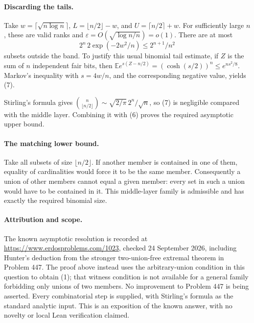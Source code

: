 \paragraph{Discarding the tails.}
Take \(w=\lceil\sqrt{n\log n}\rceil\),
\(L=\lfloor n/2\rfloor-w\), and \(U=\lceil n/2\rceil+w\).
For sufficiently large \(n\), these are valid ranks and
\(\varepsilon=O(\sqrt{\log n/n})=o(1)\).
There are at most
\[
 2^n\,2\exp(-2w^2/n)\leq 2^{n+1}/n^2 \tag{7}
\]
subsets outside the band. To justify this usual binomial tail estimate, if \(Z\) is the sum of \(n\) independent fair bits, then
\(\mathbb E e^{s(Z-n/2)}=(\cosh(s/2))^n\leq e^{ns^2/8}\).
Markov's inequality with \(s=4w/n\), and the corresponding negative value, yields (7).

Stirling's formula gives
\(\binom n{\lfloor n/2\rfloor}\sim\sqrt{2/\pi}\,2^n/\sqrt n\), so (7) is negligible compared with the middle layer. Combining it with (6) proves the required asymptotic upper bound.

\paragraph{The matching lower bound.}
Take all subsets of size \(\lfloor n/2\rfloor\). If another member is contained in one of them, equality of cardinalities would force it to be the same member. Consequently a union of other members cannot equal a given member: every set in such a union would have to be contained in it. This middle-layer family is admissible and has exactly the required binomial size.

\paragraph{Attribution and scope.}
The known asymptotic resolution is recorded at \url{https://www.erdosproblems.com/1023}, checked 24 September 2026, including Hunter's deduction from the stronger two-union-free extremal theorem in Problem 447. The proof above instead uses the arbitrary-union condition in this question to obtain (1); that witness condition is not available for a general family forbidding only unions of two members. No improvement to Problem 447 is being asserted. Every combinatorial step is supplied, with Stirling's formula as the standard analytic input. This is an exposition of the known answer, with no novelty or local Lean verification claimed.
